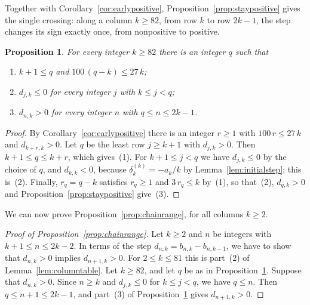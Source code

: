 \documentclass{amsart}
\newtheorem{proposition}[theorem]{Proposition}
\theoremstyle{definition}
\theoremstyle{remark}
\numberwithin{equation}{section}
\begin{document}
Together with Corollary~\ref{cor:earlypositive}, Proposition~\ref{prop:staypositive} gives the single crossing: along a column $k\ge 82$, from row $k$ to row $2k-1$, the step changes its sign exactly once, from nonpositive to positive.

\begin{proposition}\label{prop:onecrossing}
For every integer $k\ge 82$ there is an integer $q$ such that
\begin{enumerate}
\item $k+1\le q$ and $100\,(q-k)\le 27\,k$;
\item $d_{j,k}\le 0$ for every integer $j$ with $k\le j<q$;
\item $d_{n,k}>0$ for every integer $n$ with $q\le n\le 2k-1$.
\end{enumerate}
\end{proposition}

\begin{proof}
By Corollary~\ref{cor:earlypositive} there is an integer $r\ge 1$ with $100\,r\le 27\,k$ and $d_{k+r,k}>0$. Let $q$ be the least row $j\ge k+1$ with $d_{j,k}>0$. Then $k+1\le q\le k+r$, which gives~(1). For $k+1\le j<q$ we have $d_{j,k}\le 0$ by the choice of $q$, and $d_{k,k}<0$, because $\delta^{(k)}_k=-a_k/k$ by Lemma~\ref{lem:initialstep}; this is~(2). Finally, $r_q=q-k$ satisfies $r_q\ge 1$ and $3\,r_q\le k$ by~(1), so that~(2), $d_{q,k}>0$ and Proposition~\ref{prop:staypositive} give~(3).
\end{proof}

We can now prove Proposition~\ref{prop:chainrange}, for all columns $k\ge 2$.

\begin{proof}[Proof of Proposition~\ref{prop:chainrange}]
Let $k\ge 2$ and $n$ be integers with $k+1\le n\le 2k-2$. In terms of the step $d_{n,k}=b_{n,k}-b_{n,k-1}$, we have to show that $d_{n,k}>0$ implies $d_{n+1,k}>0$. For $2\le k\le 81$ this is part~(2) of Lemma~\ref{lem:columntable}. Let $k\ge 82$, and let $q$ be as in Proposition~\ref{prop:onecrossing}. Suppose that $d_{n,k}>0$. Since $n\ge k$ and $d_{j,k}\le 0$ for $k\le j<q$, we have $q\le n$. Then $q\le n+1\le 2k-1$, and part~(3) of Proposition~\ref{prop:onecrossing} gives $d_{n+1,k}>0$.
\end{proof}
\end{document}
